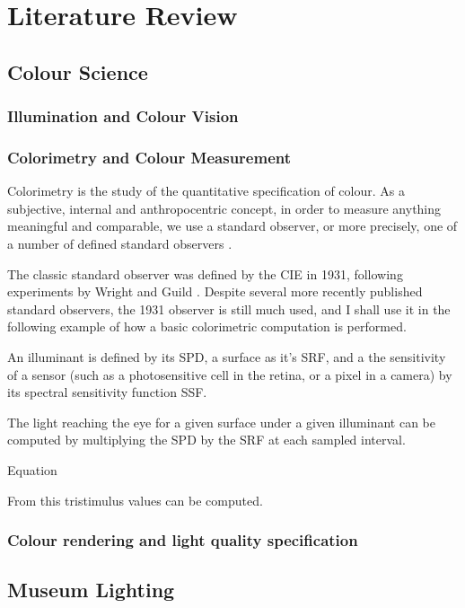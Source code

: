 \chapter{Literature Review}
\label{LitReview}

\section{Colour Science}
\subsection{Illumination and Colour Vision}
\subsection{Colorimetry and Colour Measurement}

Colorimetry is the study of the quantitative specification of colour. As a subjective, internal and anthropocentric concept, in order to measure anything meaningful and comparable, we use a standard observer, or more precisely, one of a number of defined standard observers \cite{cie_bs_2011}.

The classic standard observer was defined by the CIE in 1931, following experiments by Wright and Guild \cite{wright_re-determination_1929, guild_colorimetric_1931}. Despite several more recently published standard observers, the 1931 observer is still much used, and I shall use it in the following example of how a basic colorimetric computation is performed.

An illuminant is defined by its \gls{SPD}, a surface as it's \gls{SRF}, and a the sensitivity of a sensor (such as a photosensitive cell in the retina, or a pixel in a camera) by its spectral sensitivity function \gls{SSF}.

The light reaching the eye for a given surface under a given illuminant can be computed by multiplying the \gls{SPD} by the \gls{SRF} at each sampled interval.

Equation

From this tristimulus values can be computed.

\subsection{Colour rendering and light quality specification}

\section{Museum Lighting}
